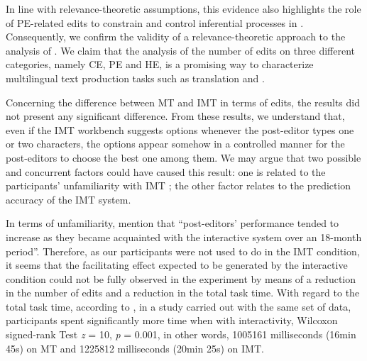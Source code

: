 \documentclass[output=paper]{langsci/langscibook}
\begin{document}
In line with relevance-theoretic assumptions, this evidence also highlights the role of PE-related edits to constrain and control inferential processes in .  Consequently, we confirm the validity of a relevance-theoretic approach to the analysis of . We claim that the analysis of the number of edits on three different categories, namely CE, PE and HE, is a promising way to characterize multilingual text production tasks such as translation and .  



Concerning the difference between MT and IMT in terms of edits, the results did not present any significant difference.  From these results, we understand that, even if the IMT workbench suggests options whenever the post-editor types one or two characters, the options appear somehow in a controlled manner for the post-editors to choose the best one among them. We may argue that two possible and concurrent factors could have caused this result: one is related to the participants' unfamiliarity with IMT ; the other factor relates to the prediction accuracy of the IMT system.  



In terms of unfamiliarity, \citet[553]{Underwood2014} mention that ``post-editors' performance tended to increase as they became acquainted with the interactive system over an 18-month period''.  Therefore, as our participants were not used to do  in the IMT condition, it seems that the facilitating effect expected to be generated by the interactive condition could not be fully observed in the experiment by means of a reduction in the number of edits and a reduction in the total task time. With regard to the total task time, according to \citet{alves2015}, in a study carried out with the same set of data, participants spent significantly more time when  with interactivity, Wilcoxon signed-rank Test \textit{z} = 10, \textit{p} = 0.001, in other words, 1005161 milliseconds (16min 45s) on MT and 1225812 milliseconds (20min 25s) on IMT. 
\end{document}
